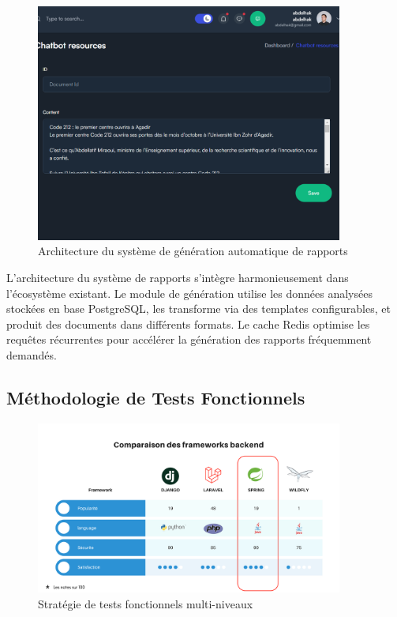 \begin{figure}[H]
\centering
\includegraphics[width=0.9\textwidth]{assets/images/admin-doc.png}
\caption{Architecture du système de génération automatique de rapports}
\label{fig:reports-architecture}
\end{figure}

L'architecture du système de rapports s'intègre harmonieusement dans l'écosystème existant. Le module de génération utilise les données analysées stockées en base PostgreSQL, les transforme via des templates configurables, et produit des documents dans différents formats. Le cache Redis optimise les requêtes récurrentes pour accélérer la génération des rapports fréquemment demandés.

\subsection{Méthodologie de Tests Fonctionnels}

\begin{figure}[H]
\centering
\includegraphics[width=0.9\textwidth]{assets/images/bechmark.png}
\caption{Stratégie de tests fonctionnels multi-niveaux}
\label{fig:testing-strategy}
\end{figure}

